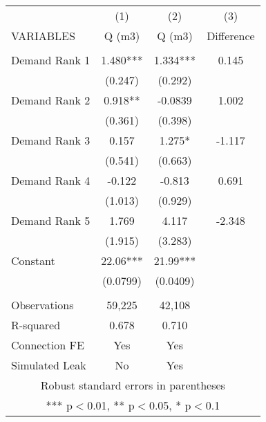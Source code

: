\begin{tabular}{lccc} \hline
 & (1) & (2) & (3) \\
VARIABLES & Q (m3) & Q (m3) & Difference \\ \hline
 &  &  &  \\
Demand Rank 1 & 1.480*** & 1.334*** & 0.145 \\
 & (0.247) & (0.292) &  \\
Demand Rank 2 & 0.918** & -0.0839 & 1.002 \\
 & (0.361) & (0.398) &  \\
Demand Rank 3 & 0.157 & 1.275* & -1.117 \\
 & (0.541) & (0.663) &  \\
Demand Rank 4 & -0.122 & -0.813 & 0.691 \\
 & (1.013) & (0.929) &  \\
Demand Rank 5 & 1.769 & 4.117 & -2.348 \\
 & (1.915) & (3.283) &  \\
Constant & 22.06*** & 21.99*** &  \\
 & (0.0799) & (0.0409) &  \\
 &  &  &  \\
Observations & 59,225 & 42,108 &  \\
R-squared & 0.678 & 0.710 &  \\
Connection FE & Yes & Yes &  \\
 Simulated Leak & No & Yes &  \\ \hline
\multicolumn{4}{c}{ Robust standard errors in parentheses} \\
\multicolumn{4}{c}{ *** p$<$0.01, ** p$<$0.05, * p$<$0.1} \\
\end{tabular}
